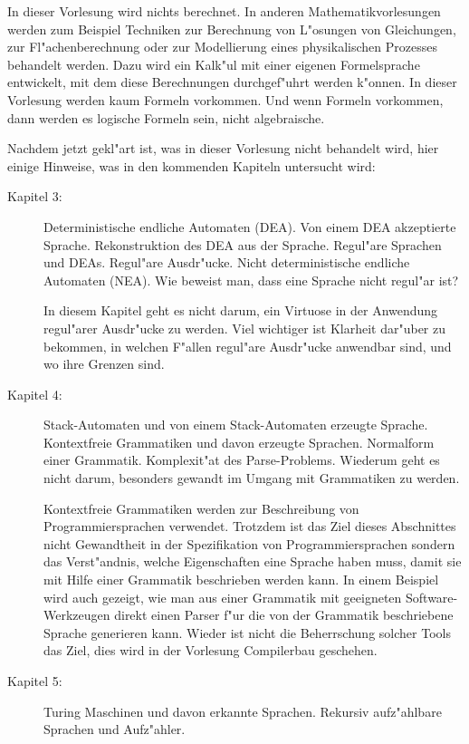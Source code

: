 In dieser Vorlesung wird nichts berechnet.
In anderen
Mathematikvorlesungen werden zum Beispiel Techniken zur Berechnung
von L"osungen von
Gleichungen, zur Fl"achenberechnung oder zur Modellierung eines 
physikalischen Prozesses behandelt werden.
Dazu wird ein Kalk"ul mit einer eigenen Formelsprache entwickelt,
mit dem diese Berechnungen durchgef"uhrt werden k"onnen.
In dieser Vorlesung werden kaum Formeln vorkommen. 
Und wenn Formeln vorkommen, dann werden es logische Formeln sein,
nicht algebraische.

Nachdem jetzt gekl"art ist, was in dieser Vorlesung nicht behandelt
wird, hier einige Hinweise, was in den kommenden Kapiteln untersucht
wird:
\begin{description}
\item[Kapitel 3:] Deterministische endliche Automaten (DEA). Von einem
DEA akzeptierte Sprache. Rekonstruktion des DEA aus der Sprache.
Regul"are Sprachen und DEAs. Regul"are Ausdr"ucke. Nicht deterministische
endliche Automaten (NEA). Wie beweist man, dass eine Sprache nicht regul"ar
ist?

In diesem Kapitel geht es nicht darum, ein Virtuose in der
Anwendung regul"arer Ausdr"ucke zu werden. Viel wichtiger ist Klarheit dar"uber
zu bekommen, in welchen F"allen regul"are Ausdr"ucke anwendbar sind,
und wo ihre Grenzen sind.

\item[Kapitel 4:] Stack-Automaten und von einem Stack-Automaten
erzeugte Sprache. Kontextfreie Grammatiken und davon erzeugte Sprachen. 
Normalform einer Grammatik. Komplexit"at des Parse-Problems.
Wiederum geht es nicht darum, besonders gewandt im Umgang mit Grammatiken
zu werden.

Kontextfreie Grammatiken werden zur Beschreibung von Programmiersprachen verwendet.
Trotzdem ist das Ziel dieses Abschnittes nicht Gewandtheit in der Spezifikation
von Programmiersprachen sondern das Verst"andnis, welche Eigenschaften eine
Sprache haben muss, damit sie mit Hilfe einer Grammatik beschrieben werden kann.
In einem Beispiel wird auch gezeigt, wie man aus einer Grammatik mit geeigneten
Software-Werkzeugen direkt einen Parser f"ur die von der Grammatik beschriebene
Sprache generieren kann. Wieder ist nicht die Beherrschung solcher Tools das
Ziel, dies wird in der Vorlesung Compilerbau geschehen.

\item[Kapitel 5:] Turing Maschinen und davon erkannte Sprachen. 
Rekursiv aufz"ahlbare Sprachen und Aufz"ahler.


\end{description}
